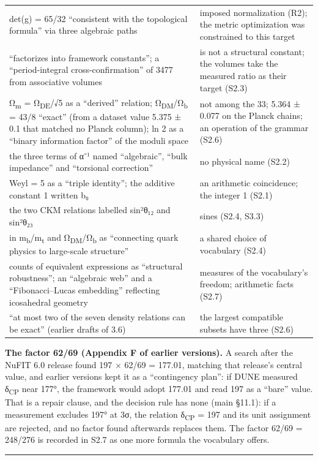 \documentclass[11pt,a4paper]{article}
\begin{document}
\begin{longtable}[]{@{}
  >{\raggedright\arraybackslash}p{}
  >{\raggedright\arraybackslash}p{}@{}}
det(g) = 65/32 ``consistent with the topological formula'' via three algebraic paths & imposed normalization (R2); the metric optimization was constrained to this target \\
3477 ``factorizes into framework constants''; a ``period-integral cross-confirmation'' of 3477 from associative volumes & 19 is not a structural constant; the volumes take the measured ratio as their target (S2.3) \\
Ω\textsubscript{m} = Ω\textsubscript{DE}/√5 as a ``derived'' relation; Ω\textsubscript{DM}/Ω\textsubscript{b} = 43/8 ``exact'' (from a dataset value 5.375 ± 0.1 that matched no Planck column); ln 2 as a ``binary information factor'' of the moduli space & not among the 33; 5.364 ± 0.077 on the Planck chains; an operation of the grammar (S2.6) \\
the three terms of α⁻¹ named ``algebraic'', ``bulk impedance'' and ``torsional correction'' & no physical name (S2.2) \\
Weyl = 5 as a ``triple identity''; the additive constant 1 written b₀ & an arithmetic coincidence; the integer 1 (S2.1) \\
the two CKM relations labelled sin²θ₁₂ and sin²θ₂₃ & sines (S2.4, S3.3) \\
42 in m\textsubscript{b}/m\textsubscript{t} and Ω\textsubscript{DM}/Ω\textsubscript{b} as ``connecting quark physics to large-scale structure'' & a shared choice of vocabulary (S2.4) \\
counts of equivalent expressions as ``structural robustness''; an ``algebraic web'' and a ``Fibonacci--Lucas embedding'' reflecting icosahedral geometry & measures of the vocabulary's freedom; arithmetic facts (S2.7) \\
``at most two of the seven density relations can be exact'' (earlier drafts of 3.6) & the largest compatible subsets have three (S2.6) \\
\end{longtable}

\textbf{The factor 62/69 (Appendix F of earlier versions).} A search after the NuFIT 6.0 release found 197 × 62/69 = 177.01, matching that release's central value, and earlier versions kept it as a ``contingency plan'': if DUNE measured δ\textsubscript{CP} near 177°, the framework would adopt 177.01 and read 197 as a ``bare'' value. That is a repair clause, and the decision rule has none (main §11.1): if a measurement excludes 197° at 3σ, the relation δ\textsubscript{CP} = 197 and its unit assignment are rejected, and no factor found afterwards replaces them. The factor 62/69 = 248/276 is recorded in S2.7 as one more formula the vocabulary offers.

\begin{center}\rule{\linewidth}{0.5pt}\end{center}


\bigskip

\end{document}
